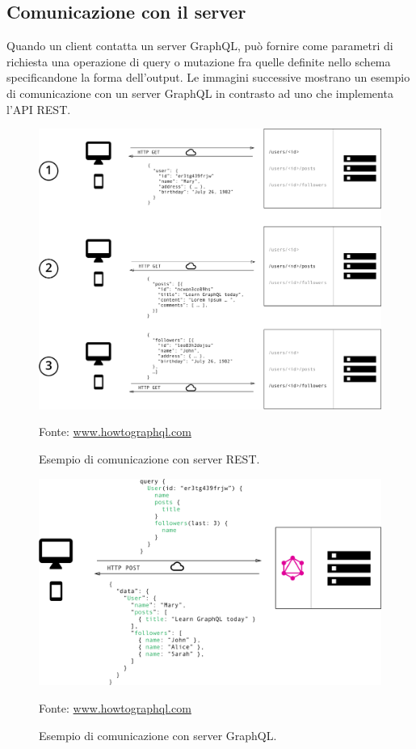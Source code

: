 \documentclass[a4paper, 12pt]{report}
\newcommand{\source}[1]{\caption*{Fonte: {#1}}}
\begin{document}
      \subsection{Comunicazione con il server}
        Quando un client contatta un server GraphQL, può fornire come parametri di richiesta una operazione di query o mutazione fra quelle definite nello schema specificandone la forma dell'output.
        Le immagini successive mostrano un esempio di comunicazione con un server GraphQL in contrasto ad uno che implementa l'API REST.
        \begin{figure}[H]
          \includegraphics[width=\textwidth]{rest-communication.png}
          \caption{Esempio di comunicazione con server REST.}
          \source{\href{https://www.howtoGraphQL.com/basics/1-GraphQL-is-the-better-rest/}{www.howtographql.com}}
        \end{figure}
        \begin{figure}[H]
          \includegraphics[width=\textwidth]{graphql-communication.png}
          \caption{Esempio di comunicazione con server GraphQL.}
          \source{\href{https://www.howtoGraphQL.com/basics/1-GraphQL-is-the-better-rest/}{www.howtographql.com}}
        \end{figure}
\end{document}
